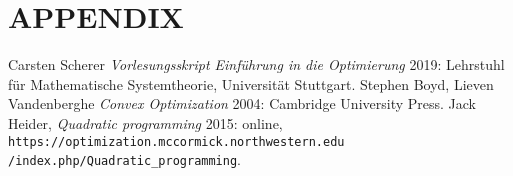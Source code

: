 \documentclass[a4paper, 10pt, conference]{ieeeconf}      %
\begin{document}


\section*{APPENDIX}





%
%
\newpage
\begin{thebibliography}{99}
	   Carsten Scherer {\em Vorlesungsskript Einführung in die Optimierung} 2019: Lehrstuhl für Mathematische Systemtheorie, Universität Stuttgart.
	   Stephen Boyd, Lieven Vandenberghe {\em Convex Optimization} 2004: Cambridge University Press.
	   Jack Heider, {\em Quadratic programming}  2015: online, \verb|https://optimization.mccormick.northwestern.edu|\\ \verb|/index.php/Quadratic_programming|.
\end{thebibliography}
\end{document}
